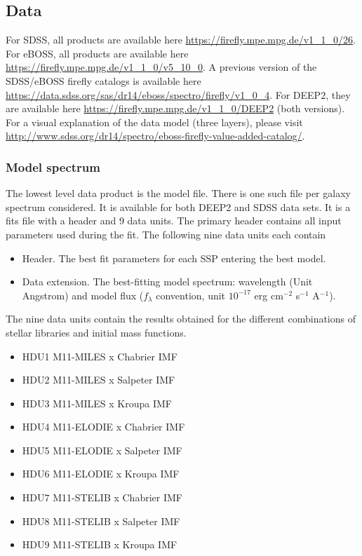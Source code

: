\documentclass[onecolumn]{aa}
\begin{document}
\subsection{Data}

For SDSS, all products are available here 
\url{https://firefly.mpe.mpg.de/v1_1_0/26}. 
For eBOSS, all products are available here 
\url{https://firefly.mpe.mpg.de/v1_1_0/v5_10_0}. 
A previous version of the SDSS/eBOSS firefly catalogs is available here 
\url{https://data.sdss.org/sas/dr14/eboss/spectro/firefly/v1_0_4}.
For DEEP2, they are available here 
\url{https://firefly.mpe.mpg.de/v1_1_0/DEEP2} (both versions).
For a visual explanation of the data model (three layers), please visit \url{http://www.sdss.org/dr14/spectro/eboss-firefly-value-added-catalog/}.

\subsubsection{Model spectrum}
The lowest level data product is the model file. 
There is one such file per galaxy spectrum considered. 
It is available for both DEEP2 and SDSS data sets. 
It is a fits file with a header and 9 data units. 
The primary header contains all input parameters used during the fit.
The following nine data units each contain 
\begin{itemize}
\item Header. The best fit parameters for each SSP entering the best model. 
\item Data extension. The best-fitting model spectrum: wavelength (Unit Angstrom) and model flux ($f_\lambda$ convention, unit $10^{-17}$ erg cm$^{-2}$ s$^{-1}$ A$^{-1}$). 
\end{itemize} 

The nine data units contain the results obtained for the different combinations of stellar libraries and initial mass functions. 
\begin{itemize}
\item HDU1 M11-MILES x Chabrier IMF
\item HDU2 M11-MILES x Salpeter IMF
\item HDU3 M11-MILES x Kroupa IMF
\item HDU4 M11-ELODIE x Chabrier IMF
\item HDU5 M11-ELODIE x Salpeter IMF
\item HDU6 M11-ELODIE x Kroupa IMF
\item HDU7 M11-STELIB x Chabrier IMF
\item HDU8 M11-STELIB x Salpeter IMF
\item HDU9 M11-STELIB x Kroupa IMF
\end{itemize}
\end{document}
